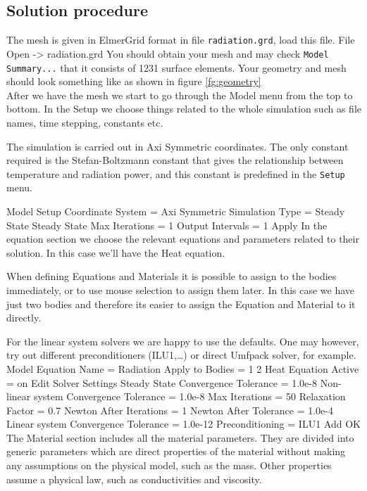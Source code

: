 \subsection*{Solution procedure}

The mesh is given in ElmerGrid format in file \texttt{radiation.grd}, load this file.
\ttbegin
File 
  Open -> radiation.grd
\ttend
You should obtain your mesh and may check \texttt{Model Summary...} that 
it consists of 1231 surface elements.  Your geometry and mesh should look something
like as shown in figure \ref{fg:geometry}\\


After we have the mesh we start to go through the Model menu from the top to bottom. 
In the Setup we choose things related to the whole simulation such as file names, 
time stepping, constants etc.  

The simulation is carried out in Axi Symmetric coordinates. The only constant 
required is the Stefan-Boltzmann constant that gives the
relationship between temperature and radiation power, and this
constant is predefined in the \texttt{Setup} menu.

\ttbegin
Model
  Setup 
     Coordinate System = Axi Symmetric
     Simulation Type = Steady State
     Steady State Max Iterations = 1
     Output Intervals = 1
  Apply
\ttend
In the equation section we choose the relevant equations and parameters related to their solution. 
In this case we'll have the Heat equation.

When defining Equations and Materials it is possible to assign to the bodies 
immediately, or to use mouse selection to assign them later. In this case we 
have just two bodies and therefore its easier to assign the Equation and 
Material to it directly.

For the linear system solvers we are happy to use the defaults. One may however, try out different
preconditioners (ILU1,\ldots) or direct Umfpack solver, for example.
\ttbegin
Model
  Equation
   Name = Radiation
    Apply to Bodies = 1 2
    Heat Equation
      Active = on
    Edit Solver Settings
       Steady State
         Convergence Tolerance = 1.0e-8
       Non-linear system
        Convergence Tolerance = 1.0e-8
        Max Iterations = 50
        Relaxation Factor = 0.7
        Newton After Iterations = 1
        Newton After Tolerance = 1.0e-4
      Linear system
        Convergence Tolerance = 1.0e-12
        Preconditioning = ILU1
    Add 
    OK
\ttend        
The Material section includes all the material parameters. They are divided into 
generic parameters which are direct properties of the material without making 
any assumptions on the physical model, such as the mass. Other properties 
assume a physical law, such as conductivities and viscosity. 

